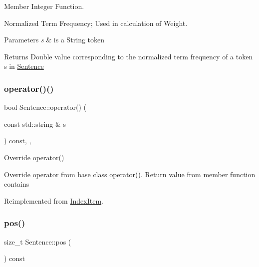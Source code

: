 Member Integer Function. 

Normalized Term Frequency; Used in calculation of Weight.


\begin{DoxyParams}{Parameters}
{\em s} & is a String token \\
\hline
\end{DoxyParams}
\begin{DoxyReturn}{Returns}
Double value corresponding to the normalized term frequency of a token s in \hyperlink{class_sentence}{Sentence} 
\end{DoxyReturn}
\mbox{\label{class_sentence_aacbd8da0eeadd6a544f00c7ea4169c79}} 
\subsubsection{\texorpdfstring{operator()()}{operator()()}}
{\footnotesize\ttfamily bool Sentence\+::operator() (\begin{DoxyParamCaption}\item[{const std\+::string \&}]{s }\end{DoxyParamCaption}) const\hspace{0.3cm}{\ttfamily [inline]}, {\ttfamily [override]}, {\ttfamily [virtual]}}



Override operator() 

Override operator from base class operator(). Return value from member function contains 

Reimplemented from \hyperlink{class_index_item_a38ccc46639b8d0b066024bad728c1bfa}{Index\+Item}.

\mbox{\label{class_sentence_af98c9ff5c5be578e7e45057ebd9b899b}} 
\subsubsection{\texorpdfstring{pos()}{pos()}}
{\footnotesize\ttfamily size\+\_\+t Sentence\+::pos (\begin{DoxyParamCaption}{ }\end{DoxyParamCaption}) const\hspace{0.3cm}{\ttfamily [inline]}}



